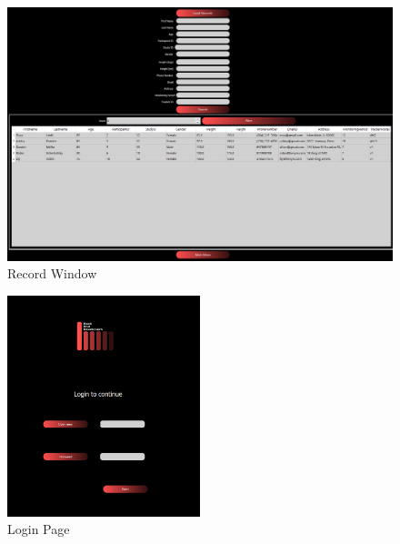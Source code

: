 \documentclass[12pt, titlepage]{article}
\begin{document}
\begin{figure}[H]
	\begin{center}
		 \includegraphics[width=1\textwidth]{Record}
		\caption{Record Window}
		\label{Record} 
	\end{center}
\end{figure}

\begin{figure}[H]
	\begin{center}
		 \includegraphics[width=0.5\textwidth]{login}
		\caption{Login Page}
		\label{Login} 
	\end{center}
\end{figure}
\end{document}
